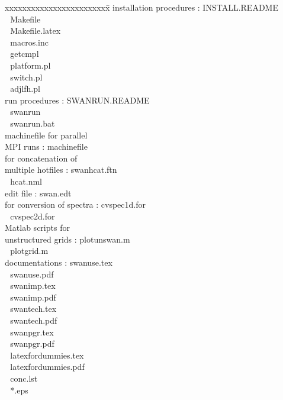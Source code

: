 \documentclass[12pt]{book}
\begin{document}
\begin{tabbing}
xxxxxxxxxxxxxxxxxxxxxxxx\= \kill
installation procedures   \>:       INSTALL.README \\
                          \> $\,\,$ Makefile \\
                          \> $\,\,$ Makefile.latex \\
                          \> $\,\,$ macros.inc \\
                          \> $\,\,$ getcmpl \\
                          \> $\,\,$ platform.pl \\
                          \> $\,\,$ switch.pl \\
                          \> $\,\,$ adjlfh.pl \\
run procedures            \>:       SWANRUN.README \\
                          \> $\,\,$ swanrun \\
                          \> $\,\,$ swanrun.bat \\
machinefile for parallel  \> $\,\,$ \\
MPI runs                  \>:       machinefile \\
for concatenation of      \> $\,\,$ \\
multiple hotfiles         \>:       swanhcat.ftn \\
                          \> $\,\,$ hcat.nml \\
edit file                 \>:       swan.edt \\
for conversion of spectra \>:       cvspec1d.for \\
                          \> $\,\,$ cvspec2d.for \\
Matlab scripts for        \> $\,\,$ \\
unstructured grids        \>:       plotunswan.m \\
                          \> $\,\,$ plotgrid.m \\
documentations            \>:       swanuse.tex \\
                          \> $\,\,$ swanuse.pdf \\
                          \> $\,\,$ swanimp.tex \\
                          \> $\,\,$ swanimp.pdf \\
                          \> $\,\,$ swantech.tex \\
                          \> $\,\,$ swantech.pdf \\
                          \> $\,\,$ swanpgr.tex \\
                          \> $\,\,$ swanpgr.pdf \\
                          \> $\,\,$ latexfordummies.tex \\
                          \> $\,\,$ latexfordummies.pdf \\
                          \> $\,\,$ conc.lst \\
                          \> $\,\,$ *.eps \\
\end{tabbing}
\end{document}

